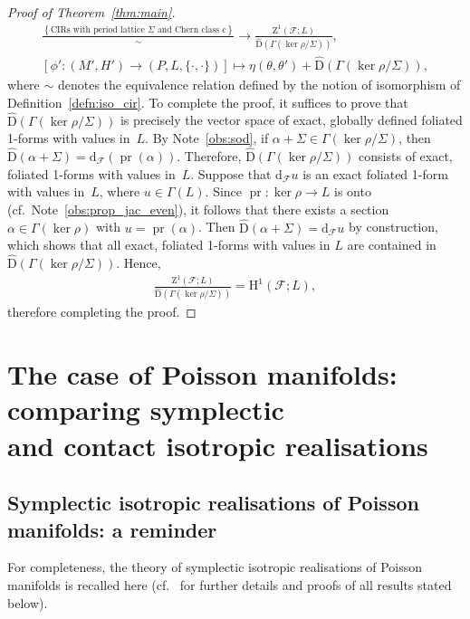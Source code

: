 \documentclass[pdftex]{sigma}
\numberwithin{equation}{section}
\newcommand{\de}{\mathrm{d}} %
\newcommand{\JM}{(P,L,\{\cdot,\cdot\})} %
\newcommand{\HH}{\mathrm{H}}
\begin{document}
\begin{proof}[Proof of Theorem~\ref{thm:main}]
 \begin{gather} \label{eq:18}
\frac{\left\{ \text{CIRs with period lattice } \Sigma \text{ and Chern
 class } c\right\}}{\sim} \to \frac{\mathrm{Z}^1(\mathcal{F};L)}{\hat{\mathrm{D}}(\Gamma(\ker \rho/\Sigma))}, \\
\left[ \phi' \colon (M',H') \to \JM\right] \mapsto \eta(\theta,\theta') + \hat{\mathrm{D}}(\Gamma(\ker \rho/\Sigma)),\nonumber
 \end{gather}
where $\sim$ denotes the equivalence relation def\/ined by the notion of isomorphism of Def\/inition~\ref{defn:iso_cir}. To complete the proof, it suf\/f\/ices to prove that $\hat{\mathrm{D}}(\Gamma(\ker \rho/\Sigma))$ is precisely the vector space of exact, globally def\/ined foliated 1-forms with values in~$L$. By Note~\ref{obs:sod}, if $\alpha + \Sigma \in \Gamma (\ker \rho/\Sigma )$, then $\hat{\mathrm{D}}(\alpha + \Sigma) = \de_{\mathcal{F}} (\operatorname{pr}(\alpha) )$. Therefore, $\hat{\mathrm{D}}(\Gamma(\ker \rho/\Sigma))$ consists of exact, foliated 1-forms with values in~$L$. Suppose that $\de_{\mathcal{F}}u$ is an exact foliated 1-form with values in~$L$, where $u \in \Gamma(L)$. Since $\operatorname{pr}\colon \ker \rho \to L$ is onto (cf.\ Note~\ref{obs:prop_jac_even}), it follows that there exists a section $\alpha \in \Gamma(\ker \rho)$ with $u = \operatorname{pr}(\alpha)$. Then $\hat{\mathrm{D}}(\alpha + \Sigma) = \de_{\mathcal{F}}u$ by construction, which shows that all exact, foliated 1-forms with values in $L$ are contained in $\hat{\mathrm{D}} (\Gamma (\ker \rho/\Sigma))$. Hence,
 \begin{gather*}
 \frac{\mathrm{Z}^1(\mathcal{F};L)}{\hat{\mathrm{D}}(\Gamma(\ker \rho/\Sigma))} = \HH^1 (\mathcal{F};L ),
 \end{gather*}
therefore completing the proof.
\end{proof}

\section[The case of Poisson manifolds: comparing symplectic and contact isotropic\\ realisations]{The case of Poisson manifolds: comparing symplectic\\ and contact isotropic realisations}\label{sec:sympl-vers-cont}

\subsection{Symplectic isotropic realisations of Poisson manifolds: a reminder}\label{sec:sympl-isotr-real}
For completeness, the theory of symplectic isotropic realisations of Poisson manifolds is recalled here (cf.~\cite{dd} for further details and proofs of all results stated below).
\end{document}
